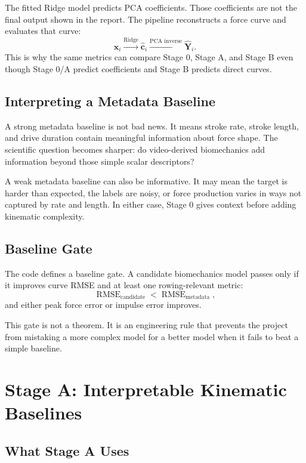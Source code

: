 \documentclass[11pt]{article}
\newcommand{\vect}[1]{\boldsymbol{#1}}
\begin{document}
The fitted Ridge model predicts PCA coefficients. Those coefficients are not
the final output shown in the report. The pipeline reconstructs a force curve
and evaluates that curve:
\[
  \vect{x}_i
  \xrightarrow{\text{Ridge}}
  \hat{\vect{c}}_i
  \xrightarrow{\text{PCA inverse}}
  \hat{\vect{Y}}_i.
\]
This is why the same metrics can compare Stage 0, Stage A, and Stage B even
though Stage 0/A predict coefficients and Stage B predicts direct curves.

\subsection{Interpreting a Metadata Baseline}

A strong metadata baseline is not bad news. It means stroke rate, stroke
length, and drive duration contain meaningful information about force shape.
The scientific question becomes sharper: do video-derived biomechanics add
information beyond those simple scalar descriptors?

A weak metadata baseline can also be informative. It may mean the target is
harder than expected, the labels are noisy, or force production varies in ways
not captured by rate and length. In either case, Stage 0 gives context before
adding kinematic complexity.

\subsection{Baseline Gate}

The code defines a baseline gate. A candidate biomechanics model passes only if
it improves curve RMSE and at least one rowing-relevant metric:
\[
  \operatorname{RMSE}_{\text{candidate}}
  <
  \operatorname{RMSE}_{\text{metadata}},
\]
and either peak force error or impulse error improves.

This gate is not a theorem. It is an engineering rule that prevents the project
from mistaking a more complex model for a better model when it fails to beat a
simple baseline.

\clearpage
\section{Stage A: Interpretable Kinematic Baselines}

\subsection{What Stage A Uses}
\end{document}
